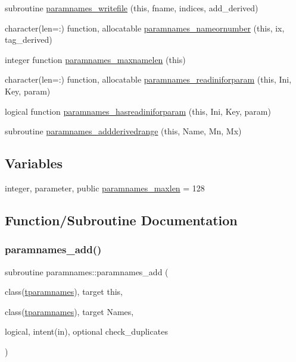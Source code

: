 \begin{DoxyCompactItemize}
\item 
subroutine \mbox{\hyperlink{namespaceparamnames_a48fa130be264dd406bc64dc0c5c7c448}{paramnames\+\_\+writefile}} (this, fname, indices, add\+\_\+derived)
\item 
character(len=\+:) function, allocatable \mbox{\hyperlink{namespaceparamnames_aeeea5572332bd77485fd7e18d1461e56}{paramnames\+\_\+nameornumber}} (this, ix, tag\+\_\+derived)
\item 
integer function \mbox{\hyperlink{namespaceparamnames_a656b7952494a591736f80bb066f04db2}{paramnames\+\_\+maxnamelen}} (this)
\item 
character(len=\+:) function, allocatable \mbox{\hyperlink{namespaceparamnames_ad3d4b6760fe5b48b0754c2d2f7f0b909}{paramnames\+\_\+readiniforparam}} (this, Ini, Key, param)
\item 
logical function \mbox{\hyperlink{namespaceparamnames_aaf4fee3bb682c36fab9b19c05bf98069}{paramnames\+\_\+hasreadiniforparam}} (this, Ini, Key, param)
\item 
subroutine \mbox{\hyperlink{namespaceparamnames_ad8c375d5eebfce2aba8f0b4de825f220}{paramnames\+\_\+addderivedrange}} (this, Name, Mn, Mx)
\end{DoxyCompactItemize}
\subsection*{Variables}
\begin{DoxyCompactItemize}
\item 
integer, parameter, public \mbox{\hyperlink{namespaceparamnames_a4be152acd9c1eea95bdadaf3e5493495}{paramnames\+\_\+maxlen}} = 128
\end{DoxyCompactItemize}


\subsection{Function/\+Subroutine Documentation}
\mbox{\label{namespaceparamnames_a6f6eda35d34074cc502b9beddae16e62}} 
\subsubsection{\texorpdfstring{paramnames\+\_\+add()}{paramnames\_add()}}
{\footnotesize\ttfamily subroutine paramnames\+::paramnames\+\_\+add (\begin{DoxyParamCaption}\item[{class(\mbox{\hyperlink{structparamnames_1_1tparamnames}{tparamnames}}), target}]{this,  }\item[{class(\mbox{\hyperlink{structparamnames_1_1tparamnames}{tparamnames}}), target}]{Names,  }\item[{logical, intent(in), optional}]{check\+\_\+duplicates }\end{DoxyParamCaption})\hspace{0.3cm}{\ttfamily [private]}}



